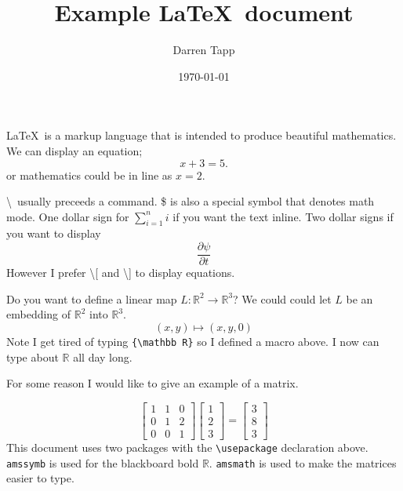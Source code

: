 \documentclass{article}
\title{Example \LaTeX\ document}
\author{Darren Tapp}
\date{\today}
\newcommand{\RR}{{\mathbb R}}
\begin{document}
\maketitle
\LaTeX\  is a markup language that is intended to produce beautiful
mathematics.  We can display an equation;
\[
x+3 = 5.
\]
or mathematics could be in line as $x=2$.

\textbackslash\ usually preceeds a command.  \$ is also a special symbol that
denotes math mode.  One dollar sign for $\sum_{i=1}^n i$ if you want
the text inline.  Two dollar signs if you want to display
$$
\frac{\partial \psi }{\partial t}
$$
However I prefer \textbackslash [ and \textbackslash ] to display equations.

Do you want to define a linear map $L:{\mathbb R}^2\to {\mathbb R}^3$?  We could
could let $L$ be an embedding of ${\mathbb R}^2$ into ${\mathbb R}^3$.
\[
(x,y) \mapsto (x,y,0)
\]
Note I get tired of typing \verb|{\mathbb R}| so I defined a macro above.  I
now can type about $\RR$ all day long.

For some reason I would like to give an example of a matrix.

\[
\begin{bmatrix}
1& 1& 0 \\
0& 1 & 2 \\
0 & 0 & 1
\end{bmatrix}
\begin{bmatrix}
1 \\
2 \\
3
\end{bmatrix}
=
\begin{bmatrix}
3 \\
8 \\
3
\end{bmatrix}
\]
This document uses two packages with the \verb|\usepackage| declaration above.
\verb|amssymb| is used for the blackboard bold $\RR$.  \verb|amsmath| is used
to make the matrices easier to type.
\end{document}
